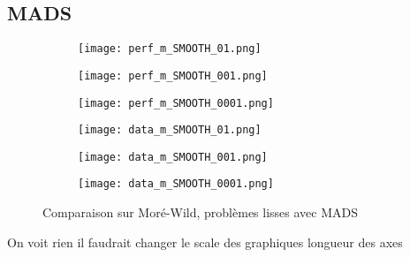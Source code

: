 \documentclass[letterpaper]{scrartcl}
\begin{document}
	\subsection{MADS}
		\begin{figure}[!htb] %
	\begin{subfigure}{0.48\textwidth}
		\texttt{[image: perf\_m\_SMOOTH\_01.png]}
	\end{subfigure}\hspace*{\fill}
	\begin{subfigure}{0.48\textwidth}
		\texttt{[image: perf\_m\_SMOOTH\_001.png]}
	\end{subfigure}
	\medskip
	\begin{subfigure}{0.48\textwidth}
		\texttt{[image: perf\_m\_SMOOTH\_0001.png]}
	\end{subfigure}\hspace*{\fill}
	\begin{subfigure}{0.48\textwidth}
		\texttt{[image: data\_m\_SMOOTH\_01.png]}
	\end{subfigure}
	\medskip
	\begin{subfigure}{0.48\textwidth}
		\texttt{[image: data\_m\_SMOOTH\_001.png]}
	\end{subfigure}\hspace*{\fill}
	\begin{subfigure}{0.48\textwidth}
		\texttt{[image: data\_m\_SMOOTH\_0001.png]}
	\end{subfigure}
	\caption{Comparaison sur Moré-Wild, problèmes lisses avec MADS} \label{fig:9}
\end{figure}
\clearpage
On voit rien il faudrait changer le scale des graphiques longueur des axes
\clearpage
\end{document}
